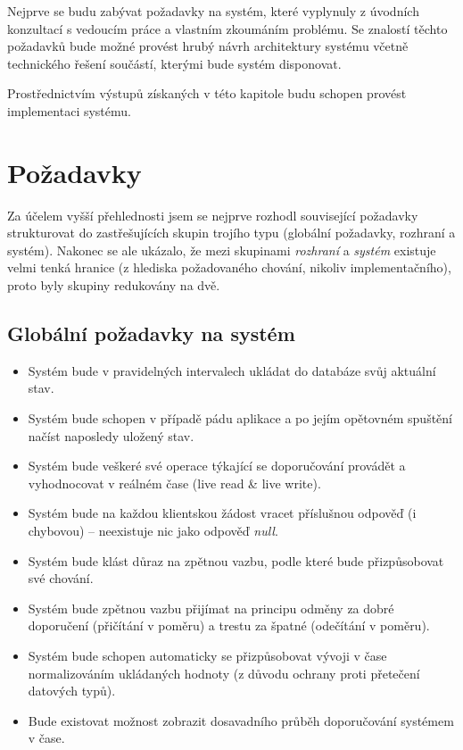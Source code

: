 \documentclass[thesis=M,czech]{FITthesis}[2014/05/07]
\begin{document}
Nejprve se budu zabývat požadavky na systém, které vyplynuly z úvodních konzultací s vedoucím práce a vlastním zkoumáním problému. Se znalostí těchto požadavků bude možné provést hrubý návrh architektury systému včetně technického řešení součástí, kterými bude systém disponovat.

Prostřednictvím výstupů získaných v této kapitole budu schopen provést implementaci systému.

\section{Požadavky}

Za účelem vyšší přehlednosti jsem se nejprve rozhodl související požadavky strukturovat do zastřešujících skupin trojího typu (globální požadavky, rozhraní a systém). Nakonec se ale ukázalo, že mezi skupinami \emph{rozhraní} a \emph{systém} existuje velmi tenká hranice (z hlediska požadovaného chování, nikoliv implementačního), proto byly skupiny redukovány na dvě.

\subsection{Globální požadavky na systém}

\begin{itemize}
	\item Systém bude v pravidelných intervalech ukládat do databáze svůj aktuální stav.
	\item Systém bude schopen v případě pádu aplikace a po jejím opětovném spuštění načíst naposledy uložený stav.
	\item Systém bude veškeré své operace týkající se doporučování provádět a vyhodnocovat v reálném čase (live read \& live write).
	\item Systém bude na každou klientskou žádost vracet příslušnou odpověď (i chybovou) – neexistuje nic jako odpověď \emph{null}.	
	\item Systém bude klást důraz na zpětnou vazbu, podle které bude přizpůsobovat své chování.
	\item Systém bude zpětnou vazbu přijímat na principu odměny za dobré doporučení (přičítání v poměru) a trestu za špatné (odečítání v poměru).
	\item Systém bude schopen automaticky se přizpůsobovat vývoji v čase normalizováním ukládaných hodnoty (z důvodu ochrany proti přetečení datových typů).
	\item Bude existovat možnost zobrazit dosavadního průběh doporučování systémem v čase.	
\end{itemize}
\end{document}
